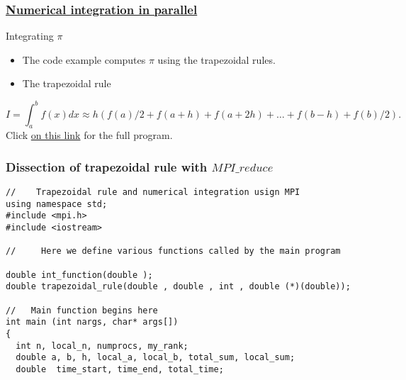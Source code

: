 \documentclass{beamer}
\begin{document}
\begin{frame}
\frametitle{\href{{https://github.com/CompPhysics/ComputationalPhysics2/blob/gh-pages/doc/Programs/LecturePrograms/programs/MPI/chapter07/program6.cpp}}{Numerical integration in parallel}}

\begin{block}{Integrating $\pi$ }

\begin{itemize}
\item The code example computes $\pi$ using the trapezoidal rules.

\item The trapezoidal rule
\end{itemize}

\noindent
\[
   I=\int_a^bf(x) dx\approx h\left(f(a)/2 + f(a+h) +f(a+2h)+\dots +f(b-h)+ f(b)/2\right).
\]
Click \href{{https://github.com/CompPhysics/ComputationalPhysics2/blob/gh-pages/doc/Programs/LecturePrograms/programs/MPI/chapter07/program6.cpp}}{on this link} for the full program.

\end{block}
\end{frame}

\begin{frame}
\frametitle{Dissection of trapezoidal rule with $MPI\_reduce$}

\begin{block}{}


















\begin{verbatim}
//    Trapezoidal rule and numerical integration usign MPI
using namespace std;
#include <mpi.h>
#include <iostream>

//     Here we define various functions called by the main program

double int_function(double );
double trapezoidal_rule(double , double , int , double (*)(double));

//   Main function begins here
int main (int nargs, char* args[])
{
  int n, local_n, numprocs, my_rank; 
  double a, b, h, local_a, local_b, total_sum, local_sum;   
  double  time_start, time_end, total_time;

\end{verbatim}


\end{block}
\end{frame}
\end{document}
